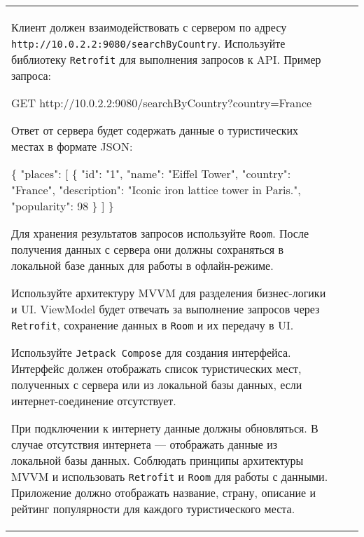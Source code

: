 \documentclass[a4paper]{article}
\begin{document}
\begin{tabular}{!{\vrule width 2pt}p{5cm}|p{6cm}|p{4cm}!{\vrule width 2pt}}
{\begin{minipage}{16cm}
\begin{enumerate}

Клиент должен взаимодействовать с сервером по адресу \texttt{http://10.0.2.2:9080/searchByCountry}. Используйте библиотеку \texttt{Retrofit} для выполнения запросов к API. Пример запроса:

 GET http://10.0.2.2:9080/searchByCountry?country=France 

Ответ от сервера будет содержать данные о туристических местах в формате JSON:

 \{ "places": [ \{ "id": "1", "name": "Eiffel Tower", 
    "country": "France", "description": "Iconic iron lattice tower in Paris.", 
    "popularity": 98 \} ] \} 


Для хранения результатов запросов используйте \texttt{Room}. После получения данных с сервера они должны сохраняться в локальной базе данных для работы в офлайн-режиме.


Используйте архитектуру MVVM для разделения бизнес-логики и UI. ViewModel будет отвечать за выполнение запросов через \texttt{Retrofit}, сохранение данных в \texttt{Room} и их передачу в UI.


Используйте \texttt{Jetpack Compose} для создания интерфейса. Интерфейс должен отображать список туристических мест, полученных с сервера или из локальной базы данных, если интернет-соединение отсутствует.


При подключении к интернету данные должны обновляться.
В случае отсутствия интернета — отображать данные из локальной базы данных.
Соблюдать принципы архитектуры MVVM и использовать \texttt{Retrofit} и \texttt{Room} для работы с данными.
Приложение должно отображать название, страну, описание и рейтинг популярности для каждого туристического места. 
\end{enumerate}


\end{minipage}}
\end{tabular}
\end{document}
